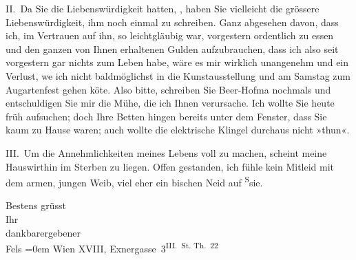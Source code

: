 \pstart
           II. Da Sie die Liebenswürdigkeit hatten, \label{K_L00326-1v}\label{K_L00326-1}, haben Sie vielleicht die grössere Liebenswürdigkeit, ihm noch
               einmal zu schreiben. Ganz abgesehen davon, dass ich, im Vertrauen auf ihn, so
               leichtgläubig war, vorgestern ordentlich zu essen und den ganzen von Ihnen erhaltenen
               Gulden aufzubrauchen, dass ich also seit vorgestern gar nichts zum Leben habe, wäre
               es mir wirklich unangenehm und ein Verlust, we{\geminationn} ich
               nicht baldmöglichst in die Kunstausstellung und am Samstag zum Augartenfest gehen kö{\geminationn}te. Also bitte, schreiben Sie Beer-Hofma{\geminationn} nochmals und entschuldigen Sie mir die Mühe, die ich Ihnen verursache. Ich
               wollte Sie heute früh aufsuchen; doch Ihre Betten hingen bereits {\pb}unter dem Fenster, dass Sie kaum zu Hause waren; auch
               wollte die elektrische Klingel durchaus nicht »thun«.\pend
           
\pstart
           III. Um die Annehmlichkeiten meines Lebens voll zu machen, scheint meine Hauswirthin im Sterben zu
               liegen. Offen gestanden, ich fühle kein Mitleid mit dem armen, jungen Weib, viel eher
               ein bischen Neid auf \substVorne{}\textsuperscript{S}\substDazwischen{}s\substHinten{}ie.\pend
           
\pstart
           Bestens grüsst{\\[\baselineskip]}Ihr{\\[\baselineskip]}dankbarergebener{\\[\baselineskip]}\spacefill\mbox{Fels}\pend
           \leftskip=0em{}
\pstart
           \noindent{}Wien XVIII, Exnergasse 3\textsuperscript{III. St. Th. 22}\pend
           
